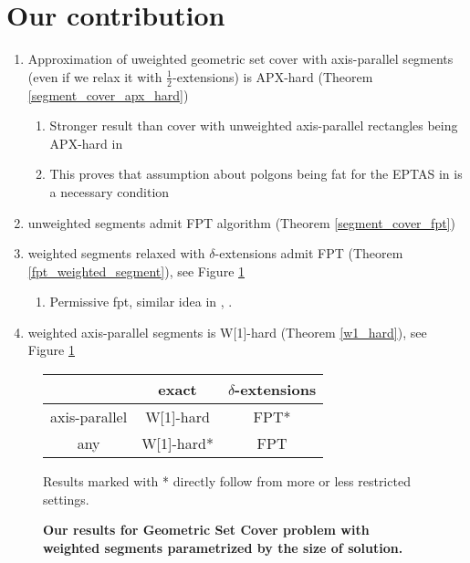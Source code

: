 \section{Our contribution}
\begin{enumerate}
\item Approximation of uweighted geometric set cover with axis-parallel segments
(even if we relax it with  $\frac{1}{2}$-extensions) is APX-hard
(Theorem \ref{segment_cover_apx_hard})
	\begin{enumerate}
	\item Stronger result than cover with unweighted axis-parallel
	rectangles being APX-hard in \cite{settling_apx_hardness}
	\item This proves that assumption about polgons being fat for
	the EPTAS in \cite{harpeled12} is a necessary condition
	\end{enumerate}
\item unweighted segments admit FPT algorithm (Theorem \ref{segment_cover_fpt})
\item weighted segments relaxed with $\delta$-extensions admit FPT (Theorem \ref{fpt_weighted_segment}),
    see Figure \ref{tab:weighted_fpt}
	\begin{enumerate}
	\item Permissive fpt, similar idea in \cite{permissive_problem1}, \cite{permissive_problem2}.
	\end{enumerate}
\item weighted axis-parallel segments is W[1]-hard (Theorem \ref{w1_hard}),
    see Figure \ref{tab:weighted_fpt}

\end{enumerate}


\begin{figure}[h]
\begin{center}
\begin{tabular}{ | c | c | c | }
\hline
                & exact     & $\delta$-extensions \\ 
\hline                
 axis-parallel   & W[1]-hard & FPT* \\  
\hline                
 any             & W[1]-hard* & FPT \\
\hline                
\end{tabular}
\caption{\textbf{Our results for Geometric Set Cover problem with weighted segments 
parametrized by the size of solution.}}

Results marked with * directly follow from more or less restricted settings.
\label{tab:weighted_fpt}
\end{center}
\end{figure}


